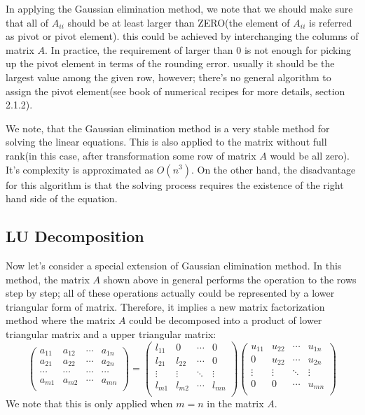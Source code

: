 In applying the Gaussian elimination method, we note that we should make sure that 
all of $A_{ii}$ should be at least larger than ZERO(the element of $A_{ii}$ is 
referred as pivot or pivot element). this could be achieved by interchanging the 
columns of matrix $A$. In practice, the requirement of larger than 0 is not enough
for picking up the pivot element in terms of the rounding error. usually it should be 
the largest value among the given row, however; there's no general algorithm to assign
the pivot element(see book of numerical recipes for more details, section 2.1.2).

We note, that the Gaussian elimination method is a very stable method for solving the 
linear equations. This is also applied to the matrix without full rank(in this case, after
transformation some row of matrix $A$ would be all zero). It's complexity is approximated
as $O(n^{3})$. On the other hand, the disadvantage for this algorithm is that the solving 
process requires the existence of the right hand side of the equation.


\subsection{LU Decomposition}
%
%
Now let's consider a special extension of Gaussian elimination method. In this method, 
the matrix $A$ shown above in general performs the operation to the rows step by step; all of 
these operations actually could be represented by a lower triangular form of matrix. Therefore,
it implies a new matrix factorization method where the matrix $A$ could be decomposed into
a product of lower triangular matrix and a upper triangular matrix:
\begin{equation}
 \label{Solution_Linear_Equations_eq:5}
  \begin{pmatrix}
a_{11}  &  a_{12}  & \cdots  & a_{1n} \\ 
a_{21}  &  a_{22}  & \cdots  & a_{2n} \\ 
\cdots  &  \cdots  & \cdots  & \cdots \\ 
a_{m1}  &  a_{m2}  & \cdots  & a_{mn} \\ 
\end{pmatrix} = 
\begin{pmatrix}
l_{11}  &  0       & \cdots  &  0     \\ 
l_{21}  &  l_{22}  & \cdots  &  0     \\ 
\vdots  &  \vdots  & \ddots  & \vdots \\ 
l_{m1}  &  l_{m2}  & \cdots  & l_{mn} \\ 
\end{pmatrix}
\begin{pmatrix}
u_{11}  &  u_{22}  & \cdots  & u_{1n} \\ 
0       &  u_{22}  & \cdots  & u_{2n} \\ 
\vdots  &  \vdots  & \ddots  & \vdots \\ 
0       &  0       & \cdots  & u_{mn} \\ 
\end{pmatrix}
\end{equation} 
We note that this is only applied when $m=n$
in the matrix $A$.

